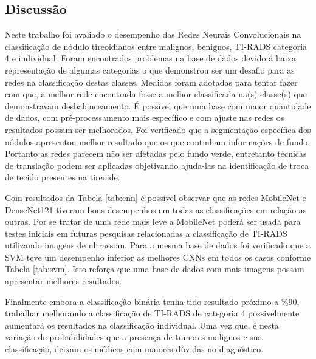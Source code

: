 \documentclass[12pt]{article}
\begin{document}
\subsection{Discussão}
Neste trabalho foi avaliado o desempenho das Redes Neurais Convolucionais na classificação de nódulo tireoidianos entre malignos, benignos, TI-RADS categoria 4 e individual. Foram encontrados problemas na base de dados devido à baixa representação de algumas categorias o que demonstrou ser um desafio para as redes na classificação destas classes. Medidas foram adotadas para tentar fazer com que, a melhor rede encontrada fosse a melhor classificada na(s) classe(s) que demonstravam desbalanceamento. É possível que uma base com maior quantidade de dados, com pré-processamento mais específico e com ajuste nas redes os resultados possam ser melhorados. Foi verificado que a segmentação específica dos nódulos apresentou melhor resultado que os que continham informações de fundo. Portanto as redes parecem não ser afetadas pelo fundo verde, entretanto técnicas de translação podem ser aplicadas objetivando ajuda-las na identificação de troca de tecido presentes na tireoide.

Com resultados da Tabela \ref{tab:cnn} é possível observar que as redes MobileNet e DenseNet121 tiveram bons desempenhos em todas as classificações em relação as outras. Por se tratar de uma rede mais leve a MobileNet poderá ser usada para testes iniciais em futuras pesquisas relacionadas a classificação de TI-RADS utilizando imagens de ultrassom. Para a mesma base de dados foi verificado que a SVM teve um desempenho inferior as melhores CNNs em todos os casos conforme Tabela \ref{tab:svm}. Isto reforça que uma base de dados com mais imagens possam apresentar melhores resultados.

Finalmente embora a classificação binária tenha tido resultado próximo a \%90, trabalhar melhorando a classificação de TI-RADS de categoria 4 possivelmente aumentará os resultados na classificação individual. Uma vez que, é nesta variação de probabilidades que a presença de tumores malignos e sua classificação, deixam os médicos com maiores dúvidas no diagnóstico.
\end{document}

